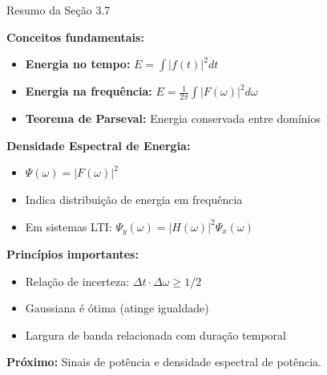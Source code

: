 
\begin{frame}{Resumo da Seção 3.7}

\textbf{Conceitos fundamentais:}

\begin{itemize}
\item \textbf{Energia no tempo:} $E = \int |f(t)|^2 dt$
\item \textbf{Energia na frequência:} $E = \frac{1}{2\pi}\int |F(\omega)|^2 d\omega$
\item \textbf{Teorema de Parseval:} Energia conservada entre domínios
\end{itemize}

\vspace{0.1cm}

\textbf{Densidade Espectral de Energia:}

\begin{itemize}
\item $\Psi(\omega) = |F(\omega)|^2$
\item Indica distribuição de energia em frequência
\item Em sistemas LTI: $\Psi_y(\omega) = |H(\omega)|^2 \Psi_x(\omega)$
\end{itemize}

\vspace{0.1cm}

\textbf{Princípios importantes:}

\begin{itemize}
\item Relação de incerteza: $\Delta t \cdot \Delta \omega \geq 1/2$
\item Gaussiana é ótima (atinge igualdade)
\item Largura de banda relacionada com duração temporal
\end{itemize}

\textbf{Próximo:} Sinais de potência e densidade espectral de potência.

\end{frame}
